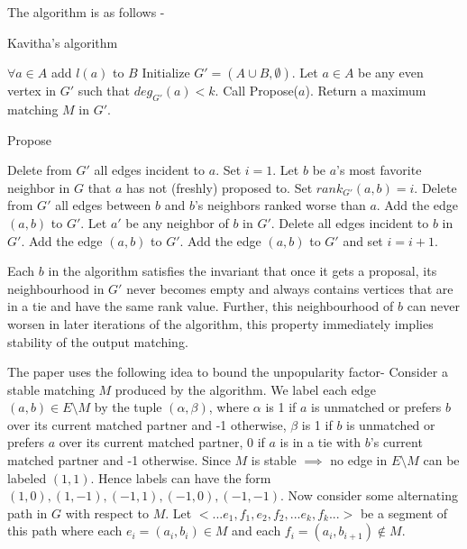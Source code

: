 \documentclass[a4paper,10pt]{article}
\theoremstyle{plain} %
\theoremstyle{plain} %
\begin{document}
The algorithm is as follows -

\begin{algorithm}[H]
\caption{Kavitha's algorithm}
\begin{algorithmic}[1]
\State $\forall a \in A$ add $l(a)$ to $B$
\State Initialize $G' = (A \cup B, \emptyset)$.
\State Let $a \in A$ be any even vertex in $G'$ such that $deg_{G'}(a) < k$.
\State Call Propose($a$).
\EndWhile
\State Return a maximum matching $M$ in $G'$.
\end{algorithmic}
\end{algorithm}

\begin{algorithm}[H]
\caption{Propose}
\begin{algorithmic}[1]
\State Delete from $G'$ all edges incident to $a$. 
\State Set $i = 1$.
\Repeat
\State Let $b$ be $a$'s most favorite neighbor in $G$ that $a$ has not (freshly) proposed to.
\State Set $rank_{G'}(a, b) = i$.
\State Delete from $G'$ all edges between $b$ and $b$'s neighbors ranked worse than $a$. 
\State Add the edge $(a, b)$ to $G'$.
\Else {}
\State Let $a'$ be any neighbor of $b$ in $G'$.
 
\State Delete all edges incident to $b$ in $G'$.
\State Add the edge $(a, b)$ to $G'$.
\Else
{} 
\State Add the edge $(a, b)$ to $G'$ and set $i = i + 1$.
\EndIf
\EndIf
\EndIf
\EndIf
{}
\end{algorithmic}
\end{algorithm}

Each $b$ in the algorithm satisfies the invariant that once it gets a proposal, its neighbourhood in $G'$ never becomes empty and always contains vertices that are in a tie and have the same rank value. Further, this neighbourhood of $b$ can never worsen in later iterations of the algorithm, this property immediately implies stability of the output matching.

The paper uses the following idea to bound the unpopularity factor-
Consider a stable matching $M$ produced by the algorithm. We label each edge $(a, b) \in E \setminus M$ by the tuple $(\alpha, \beta)$, where $\alpha$ is 1 if $a$ is unmatched or prefers $b$ over its current matched partner and -1 otherwise, $\beta$ is 1 if $b$ is unmatched or prefers $a$ over its current matched partner, 0 if $a$ is in a tie with $b$'s current matched partner and -1 otherwise. Since $M$ is stable $\implies$ no edge in $E \setminus M$ can be labeled $(1, 1)$. Hence labels can have the form $(1, 0), (1, -1), (-1, 1), (-1, 0), (-1, -1)$. Now consider some alternating path in $G$ with respect to $M$. Let $<... e_1, f_1, e_2, f_2, ... e_k, f_k ...>$ be a segment of this path where each $e_i = (a_i, b_i) \in M$ and each $f_i = (a_i, b_{i+1}) \notin M$.
\end{document}
